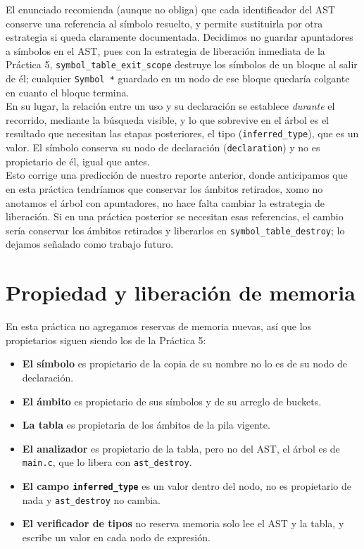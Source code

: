 \documentclass[12pt,letterpaper]{article}
\begin{document}
El enunciado recomienda (aunque no obliga) que cada identificador del AST conserve una referencia al símbolo
resuelto, y permite sustituirla por otra estrategia si queda claramente documentada. Decidimos no
guardar apuntadores a símbolos en el AST, pues  con la estrategia de liberación inmediata de la Práctica 5,
\texttt{symbol\_table\_exit\_scope} destruye los símbolos de un bloque al salir de él; cualquier
\texttt{Symbol *} guardado en un nodo de ese bloque quedaría colgante en cuanto el bloque termina.\\

En su lugar, la relación entre un uso y su declaración se establece \emph{durante} el recorrido, mediante la
búsqueda visible, y lo que sobrevive en el árbol es el resultado que necesitan las etapas posteriores, el tipo
(\texttt{inferred\_type}), que es un valor.
El símbolo conserva su nodo de declaración (\texttt{declaration}) y no es propietario de él, igual que antes.\\

Esto corrige una predicción de nuestro reporte anterior, donde anticipamos que en esta práctica tendríamos que
conservar los ámbitos retirados, xomo no anotamos el árbol con apuntadores, no hace falta cambiar la
estrategia de liberación. Si en una práctica posterior se necesitan esas referencias, el cambio sería conservar
los ámbitos retirados y liberarlos en \texttt{symbol\_table\_destroy}; lo dejamos señalado como trabajo futuro.

\section*{Propiedad y liberación de memoria}

En esta práctica no agregamos reservas de memoria nuevas, así que los propietarios siguen siendo los de la
Práctica 5:

\begin{itemize}
\item \textbf{El símbolo} es propietario de la copia de su nombre no lo es de su nodo de declaración.
\item \textbf{El ámbito} es propietario de sus símbolos y de su arreglo de buckets.
\item \textbf{La tabla} es propietaria de los ámbitos de la pila vigente.
\item \textbf{El analizador} es propietario de la tabla, pero no del AST, el árbol es de \texttt{main.c}, que
  lo libera con \texttt{ast\_destroy}.
\item \textbf{El campo \texttt{inferred\_type}} es un valor dentro del nodo, no es propietario de nada y
  \texttt{ast\_destroy} no cambia.
\item \textbf{El verificador de tipos} no reserva memoria solo lee el AST y la tabla, y escribe un valor en
  cada nodo de expresión.
\end{itemize}
\end{document}
